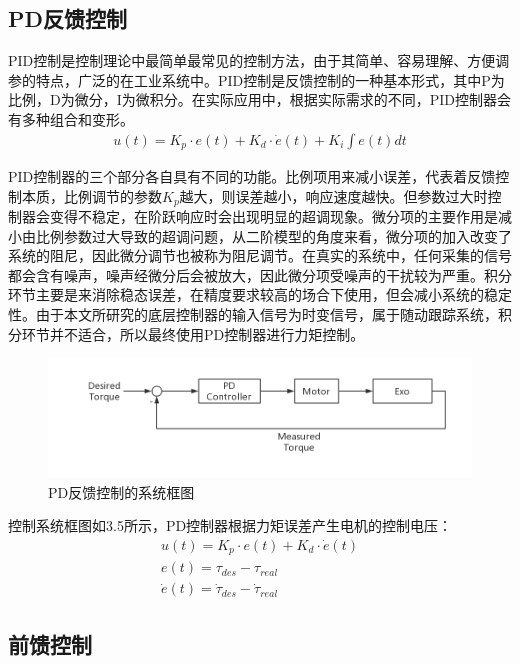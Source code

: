 \subsection{PD反馈控制}

PID控制是控制理论中最简单最常见的控制方法，由于其简单、容易理解、方便调参的特点，广泛的在工业系统中。PID控制是反馈控制的一种基本形式，其中P为比例，D为微分，I为微积分。在实际应用中，根据实际需求的不同，PID控制器会有多种组合和变形。
\begin{align}
    u(t) = K_p \cdot e(t) + K_d \cdot \dot{e}(t) + K_i\int e(t) dt
\end{align}

PID控制器的三个部分各自具有不同的功能。比例项用来减小误差，代表着反馈控制本质，比例调节的参数$K_p$越大，则误差越小，响应速度越快。但参数过大时控制器会变得不稳定，在阶跃响应时会出现明显的超调现象。微分项的主要作用是减小由比例参数过大导致的超调问题，从二阶模型的角度来看，微分项的加入改变了系统的阻尼，因此微分调节也被称为阻尼调节。在真实的系统中，任何采集的信号都会含有噪声，噪声经微分后会被放大，因此微分项受噪声的干扰较为严重。积分环节主要是来消除稳态误差，在精度要求较高的场合下使用，但会减小系统的稳定性。由于本文所研究的底层控制器的输入信号为时变信号，属于随动跟踪系统，积分环节并不适合，所以最终使用PD控制器进行力矩控制。

\begin{figure}[htb]
    \includegraphics[width=15cm]{fig/f54.jpg}
    \caption{PD反馈控制的系统框图}
    \label{fig:mark}
\end{figure}

控制系统框图如3.5所示，PD控制器根据力矩误差产生电机的控制电压：
\begin{align}
    u(t) = K_p \cdot e(t) + K_d \cdot \dot{e}(t) \\
    e(t) = \tau_{des} - \tau_{real} \\
    \dot e(t) = \dot\tau_{des} - \dot \tau_{real}
\end{align}

\subsection{前馈控制}


